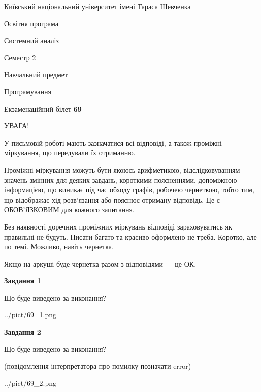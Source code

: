 \documentclass[12pt, ukrainian]{article}
\begin{document}
{{\begin {small}\par
{ \center  Київський національний університет імені Тараса Шевченка \par}
{\parbox {5 cm}{Освітня програма \hfill}{\parbox {7 cm}{Системний аналіз \hfill}}\parbox {6 cm}{\hfill Семестр 2}}\par
{\parbox {5 cm} {Навчальний предмет \hfill}\parbox {7 cm}{Програмування \hfill}\parbox {6cm}{\hfill}\par}\vspace{-7pt} \end{small}}{\center Екзаменаційний білет \No \textbf
{ 69 }\par}}
{
\begin {large}
УВАГА!

У письмовій роботі мають зазначатися всі відповіді, а також проміжні міркування, що передували їх отриманню.

Проміжні міркування можуть бути якоюсь арифметикою, відслідковуванням зна\-чень змінних для деяких завдань,
короткими поясненнями, допоміжною інформацією, що виникає під час обходу графів, робочею чернеткою,
тобто тим, що відображає хід розв’язання або пояснює отриману відповідь.
Це є ОБОВ’ЯЗКОВИМ для кожного запитання.

Без наявності доречних проміжних міркувань відповіді зараховуватись як правиль\-ні не будуть.
Писати багато та красиво оформлено не треба. Коротко, але по темі. Можли\-во, навіть чернетка.

Якщо на аркуші буде чернетка разом з відповідями --- це ОК.

\newpage

{\begin {center}\textbf{Завдання 1}\end {center}}\par
Що буде виведено за виконання?\par
\begin{center}
	{../pict/69_1.png}
\end{center}
\newpage

{\begin {center}\textbf{Завдання 2}\end {center}}\par
Що буде виведено за виконання?\par
 (повідомлення інтерпретатора про помилку позначати error)\par
\begin{center}
	{../pict/69_2.png}
\end{center}
\newpage


\end{large}}
\end{document}
